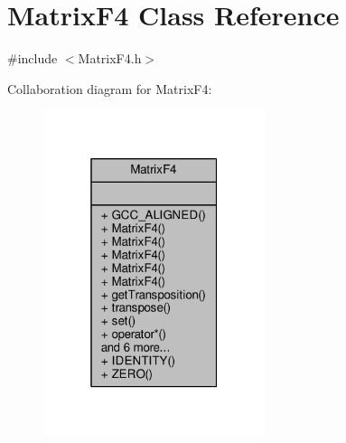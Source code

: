 \hypertarget{classMatrixF4}{\section{Matrix\-F4 Class Reference}
\label{classMatrixF4}
}


{\ttfamily \#include $<$Matrix\-F4.\-h$>$}



Collaboration diagram for Matrix\-F4\-:
\nopagebreak
\begin{figure}[H]
\begin{center}
\leavevmode
\includegraphics[width=184pt]{classMatrixF4__coll__graph}
\end{center}
\end{figure}
